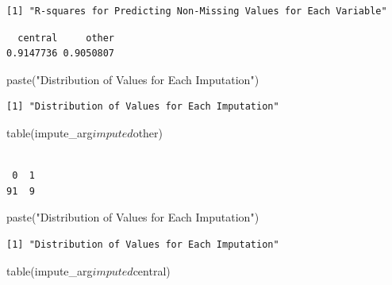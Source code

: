 \documentclass[]{article}
\newenvironment{Shaded}{}{}
\newcommand{\KeywordTok}[1]{\textcolor[rgb]{0.00,0.00,1.00}{#1}}
\newcommand{\NormalTok}[1]{#1}
\newcommand{\OperatorTok}[1]{#1}
\newcommand{\StringTok}[1]{\textcolor[rgb]{0.00,0.50,0.50}{#1}}
\begin{document}
\begin{verbatim}
[1] "R-squares for Predicting Non-Missing Values for Each Variable"
\end{verbatim}

\begin{Shaded}
\end{Shaded}

\begin{verbatim}
  central     other 
0.9147736 0.9050807 
\end{verbatim}

\begin{Shaded}
\begin{Highlighting}[]
\KeywordTok{paste}\NormalTok{(}\StringTok{"Distribution of Values for Each Imputation"}\NormalTok{)}
\end{Highlighting}
\end{Shaded}

\begin{verbatim}
[1] "Distribution of Values for Each Imputation"
\end{verbatim}

\begin{Shaded}
\begin{Highlighting}[]
\KeywordTok{table}\NormalTok{(impute_arg}\OperatorTok{$}\NormalTok{imputed}\OperatorTok{$}\NormalTok{other)}
\end{Highlighting}
\end{Shaded}

\begin{verbatim}

 0  1 
91  9 
\end{verbatim}

\begin{Shaded}
\begin{Highlighting}[]
\KeywordTok{paste}\NormalTok{(}\StringTok{"Distribution of Values for Each Imputation"}\NormalTok{)}
\end{Highlighting}
\end{Shaded}

\begin{verbatim}
[1] "Distribution of Values for Each Imputation"
\end{verbatim}

\begin{Shaded}
\begin{Highlighting}[]
\KeywordTok{table}\NormalTok{(impute_arg}\OperatorTok{$}\NormalTok{imputed}\OperatorTok{$}\NormalTok{central)}
\end{Highlighting}
\end{Shaded}
\end{document}
